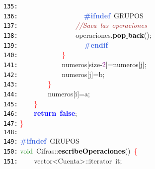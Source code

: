 \documentclass[a4paper,10pt]{scrartcl}
\begin{document}
{   \mbox{}\texttt{\textcolor{Black}{135:}} \ \ \ \ \ \ \ \  \\
   \mbox{}\texttt{\textcolor{Black}{136:}} \textbf{\textcolor{RoyalBlue}{\ \ \ \ \ \ \ \ \ \ \ \ \ \ \ \ \#ifndef}}\ GRUPOS \\
   \mbox{}\texttt{\textcolor{Black}{137:}} \ \ \ \ \ \ \ \ \ \ \ \ \ \ \ \ \textit{\textcolor{Brown}{//Saca\ las\ operaciones}} \\
   \mbox{}\texttt{\textcolor{Black}{138:}} \ \ \ \ \ \ \ \ \ \ \ \ \ \ \ \ operaciones\textcolor{BrickRed}{.}\textbf{\textcolor{Black}{pop$\_$back}}\textcolor{BrickRed}{();} \\
   \mbox{}\texttt{\textcolor{Black}{139:}} \textbf{\textcolor{RoyalBlue}{\ \ \ \ \ \ \ \ \ \ \ \ \ \ \ \ \#endif}} \\
   \mbox{}\texttt{\textcolor{Black}{140:}} \ \ \ \ \ \ \ \ \ \ \ \ \textcolor{Red}{\}} \\
   \mbox{}\texttt{\textcolor{Black}{141:}} \ \ \ \ \ \ \ \ \ \ \ \ numeros\textcolor{BrickRed}{[}size\textcolor{BrickRed}{-}\textcolor{Purple}{2}\textcolor{BrickRed}{]=}numeros\textcolor{BrickRed}{[}j\textcolor{BrickRed}{];} \\
   \mbox{}\texttt{\textcolor{Black}{142:}} \ \ \ \ \ \ \ \ \ \ \ \ numeros\textcolor{BrickRed}{[}j\textcolor{BrickRed}{]=}b\textcolor{BrickRed}{;} \\
   \mbox{}\texttt{\textcolor{Black}{143:}} \ \ \ \ \ \ \ \ \textcolor{Red}{\}} \\
   \mbox{}\texttt{\textcolor{Black}{144:}} \ \ \ \ \ \ \ \ numeros\textcolor{BrickRed}{[}i\textcolor{BrickRed}{]=}a\textcolor{BrickRed}{;} \\
   \mbox{}\texttt{\textcolor{Black}{145:}} \ \ \ \ \textcolor{Red}{\}} \\
   \mbox{}\texttt{\textcolor{Black}{146:}} \ \ \ \ \textbf{\textcolor{Blue}{return}}\ \textbf{\textcolor{Blue}{false}}\textcolor{BrickRed}{;} \\
   \mbox{}\texttt{\textcolor{Black}{147:}} \textcolor{Red}{\}} \\
   \mbox{}\texttt{\textcolor{Black}{148:}}  \\
   \mbox{}\texttt{\textcolor{Black}{149:}} \textbf{\textcolor{RoyalBlue}{\#ifndef}}\ GRUPOS \\
   \mbox{}\texttt{\textcolor{Black}{150:}} \textcolor{ForestGreen}{void}\ Cifras\textcolor{BrickRed}{::}\textbf{\textcolor{Black}{escribeOperaciones}}\textcolor{BrickRed}{()}\ \textcolor{Red}{\{}\ \ \ \  \\
   \mbox{}\texttt{\textcolor{Black}{151:}} \ \ \ \ vector\textcolor{BrickRed}{\textless{}}Cuenta\textcolor{BrickRed}{\textgreater{}::}\textcolor{TealBlue}{iterator}\ it\textcolor{BrickRed}{;} \\
}
\end{document}
